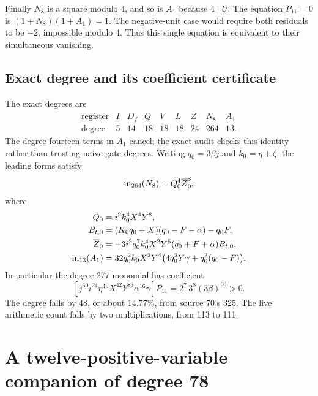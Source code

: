 Finally $N_8$ is a square modulo $4$, and so is $A_1$ because $4\mid U$.
The equation $P_{11}=0$ is $(1+N_8)(1+A_1)=1$. The negative-unit case
would require both residuals to be $-2$, impossible modulo $4$.
Thus this single equation is equivalent to their simultaneous vanishing.

\subsection{Exact degree and its coefficient certificate}

The exact degrees are
\[
\begin{array}{c|rrrrrrrr}
 \text{register}& I&D_f&Q&V&L&\overline Z&N_8&A_1\\\hline
 \text{degree}&5&14&18&18&18&24&264&13.
\end{array}
\]
The degree-fourteen terms in $A_1$ cancel; the exact audit checks this
identity rather than trusting naive gate degrees. Writing
$q_0=3\beta j$ and $k_0=\eta+\zeta$, the leading forms satisfy
\[
 \operatorname{in}_{264}(N_8)=Q_0^4\overline Z_0^8,
\]
where
\begin{align*}
 Q_0&=i^2k_0^4X^4Y^8,\\
 B_{t,0}&=(K_0q_0+X)(q_0-F-\alpha)-q_0F,\\
 \overline Z_0&=-3i^2q_0^7k_0^4X^2Y^6(q_0+F+\alpha)B_{t,0},\\
 \operatorname{in}_{13}(A_1)&=32q_0^2k_0X^2Y^4
                    \bigl(4q_0^2Y\gamma+q_0^3(q_0-F)\bigr).
\end{align*}
In particular the degree-277 monomial has coefficient
\[
 [j^{60}i^{24}\eta^{49}X^{42}Y^{85}\alpha^{16}\gamma]P_{11}
 =2^7\,3^8(3\beta)^{60}>0.
\]
The degree falls by $48$, or about $14.77\%$, from source 70's 325.
The live arithmetic count falls by two multiplications, from 113 to 111.

\section{A twelve-positive-variable companion of degree 78}

